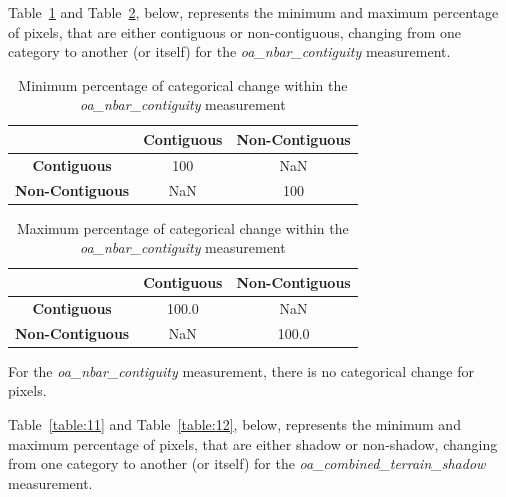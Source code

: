 \documentclass[a4paper]{article}
\begin{document}
    \begin{flushleft}
      Table~\ref{table:9} and Table~\ref{table:10}, below, represents the minimum and maximum percentage of pixels, that are either contiguous or non-contiguous, changing from one category to another (or itself) for the \textit{oa\_nbar\_contiguity} measurement.
    \end{flushleft}

    \begin{table}[ht!]
      \caption{Minimum percentage of categorical change within the \textit{oa\_nbar\_contiguity} measurement}\label{table:9}
      \centering
      \begin{tabular}{ccc} \midrule
        & \textbf{Contiguous} & \textbf{Non-Contiguous} \\ \midrule
        \textbf{Contiguous} & 100 & NaN \\
        \textbf{Non-Contiguous} & NaN & 100 \\
      \end{tabular}
    \end{table}

    \begin{table}[ht!]
      \caption{Maximum percentage of categorical change within the \textit{oa\_nbar\_contiguity} measurement}\label{table:10}
      \centering
      \begin{tabular}{ccc} \midrule
        & \textbf{Contiguous} & \textbf{Non-Contiguous} \\ \midrule
        \textbf{Contiguous} & 100.0 & NaN \\
        \textbf{Non-Contiguous} & NaN & 100.0 \\
      \end{tabular}
    \end{table}

    \begin{flushleft}
      For the \textit{oa\_nbar\_contiguity} measurement, there is no categorical change for pixels.
    \end{flushleft}

  \clearpage

    \begin{flushleft}
      Table~\ref{table:11} and Table~\ref{table:12}, below, represents the minimum and maximum percentage of pixels, that are either shadow or non-shadow, changing from one category to another (or itself) for the \textit{oa\_combined\_terrain\_shadow} measurement.
    \end{flushleft}
\end{document}
